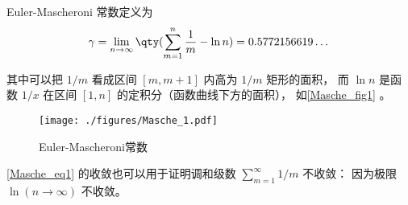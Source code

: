 
\begin{issues}
\issueDraft
\end{issues}


Euler-Mascheroni 常数定义为
\begin{equation}\label{Masche_eq1}
\gamma = \lim_{n\to\infty} \qty(\sum_{m=1}^n \frac{1}{m} - \ln n) = 0.5772156619\dots
\end{equation}

其中可以把 $1/m$ 看成区间 $[m, m+1]$ 内高为 $1/m$ 矩形的面积， 而 $\ln n$ 是函数 $1/x$ 在区间 $[1,n]$ 的定积分（函数曲线下方的面积）， 如\autoref{Masche_fig1} 。

\begin{figure}[ht]
\centering
\texttt{[image: ./figures/Masche\_1.pdf]}
\caption{Euler-Mascheroni常数} \label{Masche_fig1}
\end{figure}

\autoref{Masche_eq1} 的收敛也可以用于证明调和级数 $\sum_{m=1}^\infty 1/m$ 不收敛： 因为极限 $\ln(n\to\infty)$ 不收敛。

